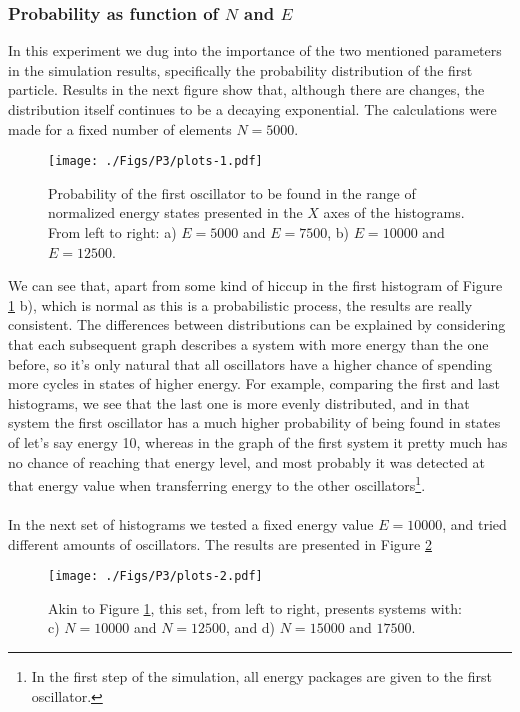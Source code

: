 \documentclass[a4paper, 12pt, notitlepage]{article}
\begin{document}
\subsubsection*{Probability as function of $N$ and $E$}
In this experiment we dug into the importance of the two mentioned parameters in the simulation results, specifically the probability distribution of the first particle. Results in the next figure show that, although there are changes, the distribution itself continues to be a decaying exponential. The calculations were made for a fixed number of elements $N = 5000$.

\begin{figure}[h]
	\centering
	\texttt{[image: ./Figs/P3/plots-1.pdf]}
	\caption{Probability of the first oscillator to be found in the range of normalized energy states presented in the $X$ axes of the histograms. From left to right: a) $E = 5000$ and $E = 7500$, b) $E = 10000$ and $E = 12500$.}\label{fig:fig2}
\end{figure}

\noindent
We can see that, apart from some kind of hiccup in the first histogram of Figure \ref{fig:fig2} b), which is normal as this is a probabilistic process, the results are really consistent. The differences between distributions can be explained by considering that each subsequent graph describes a system with more energy than the one before, so it's only natural that all oscillators have a higher chance of spending more cycles in states of higher energy. For example, comparing the first and last histograms, we see that the last one is more evenly distributed, and in that system the first oscillator has a much higher probability of being found in states of let's say energy 10, whereas in the graph of the first system it pretty much has no chance of reaching that energy level, and most probably it was detected at that energy value when transferring energy to the other oscillators\footnote{In the first step of the simulation, all energy packages are given to the first oscillator.}.\\\\
In the next set of histograms we tested a fixed energy value $E = 10000$, and tried different amounts of oscillators. The results are presented in Figure \ref{fig:fig3}

\begin{figure}[!h]
	\centering
	\texttt{[image: ./Figs/P3/plots-2.pdf]}
	\caption{Akin to Figure \ref{fig:fig2}, this set, from left to right, presents systems with: c) $N = 10000$ and $N = 12500$, and d) $N = 15000$ and $17500$.}\label{fig:fig3}
\end{figure}
\end{document}
